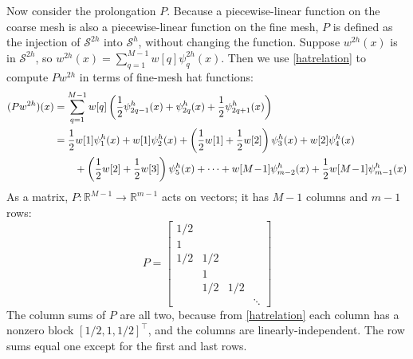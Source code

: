 \documentclass[letterpaper,final,12pt,reqno]{amsart}
\newcommand{\RR}{\mathbb{R}}
\begin{document}
Now consider the prolongation $P$.  Because a piecewise-linear function on the coarse mesh is also a piecewise-linear function on the fine mesh, $P$ is defined as the injection of $\mathcal{S}^{2h}$ into $\mathcal{S}^h$, without changing the function.  Suppose $w^{2h}(x)$ is in $\mathcal{S}^{2h}$, so $w^{2h}(x) = \sum_{q=1}^{M-1} w[q] \psi_q^{2h}(x)$.  Then we use \eqref{hatrelation} to compute $P w^{2h}$ in terms of fine-mesh hat functions:
\begin{align}
(P w^{2h})(x) &= \sum_{q=1}^{M-1} w[q] \left(\frac{1}{2} \psi_{2q-1}^h(x) + \psi_{2q}^h(x) + \frac{1}{2} \psi_{2q+1}^h(x)\right) \label{pformula} \\
              &= \frac{1}{2} w[1] \psi_1^h(x) + w[1] \psi_2^h(x) + \left(\frac{1}{2} w[1] + \frac{1}{2} w[2]\right) \psi_3^h(x) + w[2] \psi_4^h(x) \notag \\
              &\qquad + \left(\frac{1}{2} w[2] + \frac{1}{2} w[3]\right) \psi_5^h(x) + \dots + w[M\!-\!1] \psi_{m-2}^h(x) + \frac{1}{2} w[M\!-\!1] \psi_{m-1}^h(x) \notag
\end{align}
As a matrix, $P:\RR^{M-1} \to \RR^{m-1}$ acts on vectors; it has $M-1$ columns and $m-1$ rows:
\begin{equation}
P = \begin{bmatrix}
1/2 & & & \\
1 & & & \\
1/2 & 1/2 & & \\
 & 1 & & \\
 & 1/2 & 1/2 & \\
 & & & \ddots
\end{bmatrix} \label{pmatrix}
\end{equation}
The column sums of $P$ are all two, because from \eqref{hatrelation} each column has a nonzero block $[1/2,1,1/2]^\top$, and the columns are linearly-independent.  The row sums equal one except for the first and last rows.
\end{document}

